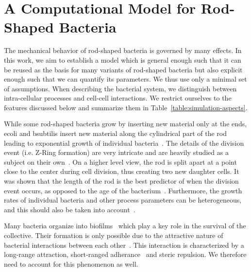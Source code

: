 \section{A Computational Model for Rod-Shaped Bacteria}
\label{sec:computational-model}
The mechanical behavior of rod-shaped bacteria is governed by many effects.
In this work, we aim to establish a model which is general enough such that it can be reused as the
basis for many variants of rod-shaped bacteria but also explicit enough such that we can quantify
its parameters. We thus use only a minimal set of assumptions.
When describing the bacterial system, we distinguish between intra-cellular processes and cell-cell
interactions. We restrict ourselves to the features discussed below and summarize them in
Table~\ref{table:simulation-aspects}.

While some rod-shaped bacteria grow by inserting new material only at the ends, \ac{ecoli} and
\ac{bsubtilis} insert new material along the cylindrical part of the rod leading to exponential
growth of individual bacteria~\cite{Amir2014,Takeuchi2005}.
The details of the division event (i.e. Z-Ring formation) are very intricate and are heavily
studied as a subject on their own~\cite{Harry2001}.
On a higher level view, the rod is split apart at a point close to the center during cell division,
thus creating two new daughter cells.
It was shown that the length of the rod is the best predictor of when the division event occurs, as
opposed to the age of the bacterium~\cite{Robert2014}.
Furthermore, the growth rates of individual bacteria and other process parameters can be
heterogeneous, and this should also be taken into account~\cite{Koutsoumanis2013}.

Many bacteria organize into biofilms~\cite{Dunne2002,Ong1999} which play a key role in the survival
of the collective.
Their formation is only possible due to the attractive nature of bacterial interactions between
each other~\cite{Berne2018}.
This interaction is characterized by a long-range attraction, short-ranged
adherance~\cite{Verwey1947,Trejo2013} and steric repulsion.
We therefore need to account for this phenomenon as well.

